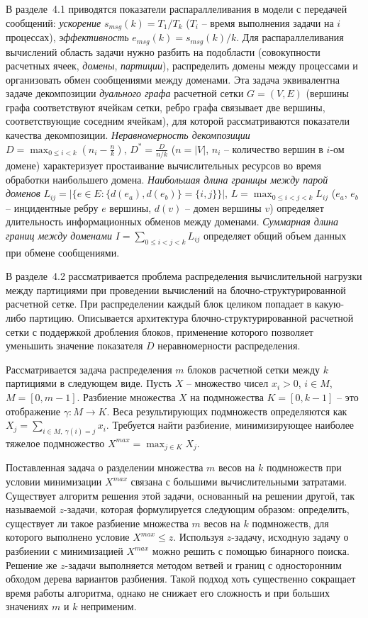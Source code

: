 \documentclass[a4paper,14pt]{extarticle}                     %
\theoremstyle{plain}                                         %
\begin{document}
В разделе~4.1 приводятся показатели распараллеливания в модели с передачей сообщений: \textit{ускорение} $s_{msg}(k) = T_1/T_k$ ($T_i$ -- время выполнения задачи на $i$ процессах), \textit{эффективность} $e_{msg}(k) = s_{msg}(k)/k$.
Для распараллеливания вычислений область задачи нужно разбить на подобласти (совокупности расчетных ячеек, \textit{домены}, \textit{партиции}), распределить домены между процессами и организовать обмен сообщениями между доменами.
Эта задача эквивалентна задаче декомпозиции \textit{дуального графа} расчетной сетки $G = (V, E)$ (вершины графа соответствуют ячейкам сетки, ребро графа связывает две вершины, соответствующие соседним ячейкам), для которой рассматриваются показатели качества декомпозиции.
\textit{Неравномерность декомпозиции} $D = \max_{0 \le i < k}{ \left( n_i - \frac{n}{k} \right) }$, $D^{*} = \frac{D}{n/k}$ ($n = |V|$, $n_i$ -- количество вершин в $i$-ом домене) характеризует простаивание вычислительных ресурсов во время обработки наибольшего домена.
\textit{Наибольшая длина границы между парой доменов} $L_{ij} = \left| \{ e \in E: \{ d(e_a), d(e_b) \} = \{ i, j \} \} \right|$, $L = \max_{0 \le i < j < k}{L_{ij}}$ ($e_a$, $e_b$ -- инцидентные ребру $e$ вершины, $d(v)$ -- домен вершины $v$) определяет длительность информационных обменов между доменами.
\textit{Суммарная длина границ между доменами} $I = \sum_{0 \le i < j < k}{L_{ij}}$ определяет общий объем данных при обмене сообщениями.


В разделе~4.2 рассматривается проблема распределения вычислительной нагрузки между партициями при проведении вычислений на блочно-структу\-рированной расчетной сетке.
При распределении каждый блок целиком попадает в какую-либо партицию.
Описывается архитектура блочно-структуриро\-ванной расчетной сетки с поддержкой дробления блоков, применение которого позволяет уменьшить значение показателя $D$ неравномерности распределения.

Рассматривается задача распределения $m$ блоков расчетной сетки между $k$ партициями в следующем виде.
Пусть $X$ -- множество чисел $x_i > 0$, $i \in M$, $M = [0, m - 1]$.
Разбиение множества $X$ на подмножества $K = [0, k - 1]$ -- это отображение $\gamma: M \rightarrow K$.
Веса результирующих подмножеств определяются как $X_j = \sum_{i \in M, \ \gamma(i) = j}{x_i}$.
Требуется найти разбиение, минимизирующее наиболее тяжелое подмножество $X^{max} = \max_{j \in K}{X_j}$.

Поставленная задача о разделении множества $m$ весов на $k$ подмножеств при условии минимизации $X^{max}$ связана с большими вычислительными затратами.
Существует алгоритм решения этой задачи, основанный на решении другой, так называемой $z$-задачи, которая формулируется следующим образом: определить, существует ли такое разбиение множества $m$ весов на $k$ подмножеств, для которого выполнено условие $X^{max} \le z$.
Используя $z$-задачу, исходную задачу о разбиении с минимизацией $X^{max}$ можно решить с помощью бинарного поиска.
Решение же $z$-задачи выполняется методом ветвей и границ с односторонним обходом дерева вариантов разбиения.
Такой подход хоть существенно сокращает время работы алгоритма, однако не снижает его сложность и при больших значениях $m$ и $k$ неприменим.
\end{document}

